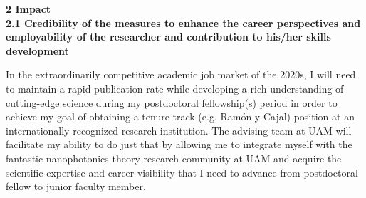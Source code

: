 \documentclass[11pt,a4paper]{article}
\newcommand{\infootcite}[1]{
    \textsuperscript{\citenum{#1}}\fullcite{#1}
}
\begin{document}





\noindent \textbf{2 Impact}\\
\noindent \textbf{2.1 Credibility of the measures to enhance the career perspectives and employability of the researcher and contribution to his/her skills development}

In the extraordinarily competitive academic job market of the 2020s, I will need to maintain a rapid publication rate while developing a rich understanding of cutting-edge science during my postdoctoral fellowship(s) period in order to achieve my goal of obtaining a tenure-track (e.g. Ram\'{o}n y Cajal) position at an internationally recognized research institution. The advising team at UAM will facilitate my ability to do just that by allowing me to integrate myself with the fantastic nanophotonics theory research community at UAM and acquire the scientific expertise and career visibility that I need to advance from postdoctoral fellow to junior faculty member.





\end{document}

